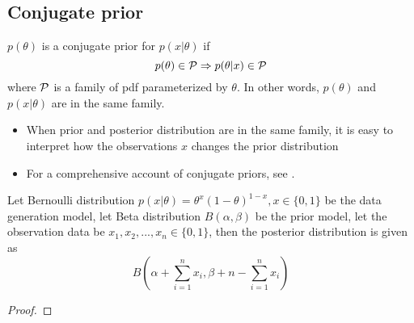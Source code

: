 \begin{refsection}
\begin{lemma}
\end{lemma}

\subsection{Conjugate prior}
\begin{definition} 
	$p(\theta)$ is a conjugate prior for $p(x|\theta)$ if
	$$p(\theta) \in \mathcal{P} \Rightarrow p(\theta|x) \in \mathcal{P}$$
	where $\mathcal{P}$ is a family of pdf parameterized by $\theta$. In other words, $p(\theta)$ and $p(x|\theta)$ are in the same family.
\end{definition}

\begin{remark}\hfill
	\begin{itemize}
		\item When prior and posterior distribution are in the same family, it is easy to interpret how the observations $x$ changes the prior distribution
		\item For a comprehensive account of conjugate priors, see \cite{fink1997compendium}\cite{wiki:conjugateprior}.
	\end{itemize}
\end{remark}


\begin{lemma}[Bernoulli]
	Let Bernoulli distribution $p(x|\theta) = \theta^x(1-\theta)^{1-x},x\in \{0,1\}$ be the data generation model, let Beta distribution $B(\alpha,\beta)$ be the prior model, let the observation data be $x_1,x_2,...,x_n \in \{0,1\}$, then the posterior distribution is given as
	$$B(\alpha + \sum_{i=1}^n x_i,\beta + n - \sum_{i=1}^n x_i)$$
\end{lemma}
\begin{proof}
	
\end{proof}




\end{refsection}
